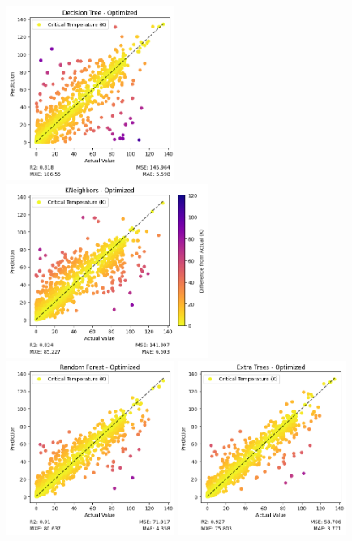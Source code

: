 \documentclass[twocolumn, nofootinbib, secnumarabic, amssymb, nobibnotes, aps, prd]{revtex4-2}
\begin{document}
\begin{figure}[t]
   \includegraphics[height=2.23in]{images/subfigures/no_uncertainty/decision_tree_optimized.png}
   \includegraphics[height=2.23in]{images/subfigures/no_uncertainty/kneighbors_optimized.png}
   \includegraphics[height=2.23in]{images/subfigures/no_uncertainty/random_forest_optimized.png}
   \includegraphics[height=2.23in]{images/subfigures/no_uncertainty/extra_trees_optimized.png}

\end{figure}
\end{document}
